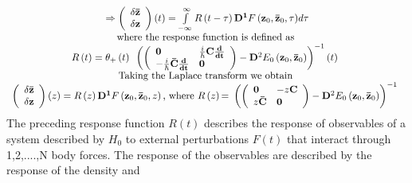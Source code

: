 \documentclass{amsart}
\begin{document}
\[\begin{array}{c}
 \Rightarrow \left( {{\begin{array}{*{20}c}
 {\delta {\rm {\bf \bar {z}}}} \hfill \\
 {\delta {\rm {\bf z}}} \hfill \\
\end{array} }} \right)\left( t \right)=\int\limits_{-\infty }^\infty
{R\left( {t-\tau } \right){\rm {\bf D}}^{\rm {\bf 1}}F\left( {{\rm {\bf
z}}_0 ,{\rm {\bf \bar {z}}}_0 ,\tau } \right)} d\tau \\
 \mbox{where the response function is defined as } \\
 R\left( t \right)=\theta _+ \left( t \right)\mbox{ }\left( {\left(
{{\begin{array}{*{20}c}
 {\rm {\bf 0}} \hfill & {\tfrac{i}{\hbar }{\rm {\bf C}}\frac{{\rm {\bf
d}}}{{\rm {\bf dt}}}} \hfill \\
 {-\tfrac{i}{\hbar }{\rm {\bf \bar {C}}}\frac{{\rm {\bf d}}}{{\rm {\bf
dt}}}} \hfill & {\rm {\bf 0}} \hfill \\
\end{array} }} \right)-{\rm {\bf D}}^2E_0 \left( {{\rm {\bf z}}_0 ,{\rm {\bf
\bar {z}}}_0 } \right)} \right)^{-1}\left( t \right)\mbox{ } \\
 \mbox{Taking the Laplace transform we obtain } \\
 \left( {{\begin{array}{*{20}c}
 {\delta {\rm {\bf \bar {z}}}} \hfill \\
 {\delta {\rm {\bf z}}} \hfill \\
\end{array} }} \right)\left( z \right)=R\left( z \right){\rm {\bf D}}^{\rm
{\bf 1}}F\left( {{\rm {\bf z}}_0 ,{\rm {\bf \bar {z}}}_0 ,z} \right)\mbox{,
where }R\left( z \right)\mbox{= }\left( {\left( {{\begin{array}{*{20}c}
 {\rm {\bf 0}} \hfill & {-z{\rm {\bf C}}} \hfill \\
 {z{\rm {\bf \bar {C}}}} \hfill & {\rm {\bf 0}} \hfill \\
\end{array} }} \right)-{\rm {\bf D}}^2E_0 \left( {{\rm {\bf z}}_0 ,{\rm {\bf
\bar {z}}}_0 } \right)} \right)^{-1}\mbox{ } \\
 \end{array}
\]
The preceding response function $R\left( t \right)$ describes the response
of observables of a system described by $H_0 $ to external perturbations
$F\left( t \right)$ that interact through 1,2,....,N body forces. The
response of the observables are described by the response of the density and
\end{document}
